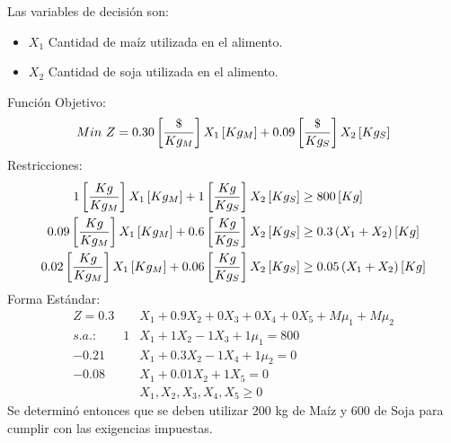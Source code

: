 \documentclass{tarea}
\begin{document}
\begin{homeworkProblem}
Las variables de decisión son:
\begin{itemize}
	\item $X_1$ Cantidad de maíz utilizada en el alimento.
	\item $X_2$ Cantidad de soja utilizada en el alimento.
\end{itemize}
Función Objetivo: 
\begin{equation}
	Min\ Z = 0.30\left[ \frac{\$}{Kg_M} \right]X_1\left[ Kg_M \right] + 0.09\left[ \frac{\$}{Kg_S} \right]X_2\left[ Kg_S \right]
\end{equation}
Restricciones:
\begin{align*}
	1\left[ \frac{Kg}{Kg_M} \right]X_1\left[ Kg_M \right] + 1\left[ \frac{Kg}{Kg_S} \right]X_2\left[ Kg_S \right] &\ge 800\left[ Kg \right] \\
	0.09\left[ \frac{Kg}{Kg_M} \right]X_1\left[ Kg_M \right] + 0.6\left[ \frac{Kg}{Kg_S} \right]X_2\left[ Kg_S \right] &\ge 0.3\left( X_1 + X_2 \right)\left[ Kg \right] \\
	0.02\left[ \frac{Kg}{Kg_M} \right]X_1\left[ Kg_M \right] + 0.06\left[ \frac{Kg}{Kg_S} \right]X_2\left[ Kg_S \right] &\ge 0.05\left( X_1 + X_2 \right)\left[ Kg \right] \\
\end{align*}
Forma Estándar:
\begin{align*}
	Z=0.3&X_1 + 0.9X_2 + 0X_3 + 0X_4 + 0X_5 + M\mu_1 + M\mu_2 \\
	s.a.:\quad \quad  1&X_1 + 1X_2 - 1X_3 + 1\mu_1 = 800 \\
	-0.21&X_1 + 0.3X_2 - 1X_4 + 1\mu_2 = 0 \\
	-0.08&X_1 + 0.01X_2 + 1X_5 = 0 \\
	&X_1,X_2,X_3,X_4,X_5  \ge 0
\end{align*}
Se determinó entonces que se deben utilizar 200 kg de Maíz y 600 de Soja para cumplir con las exigencias impuestas.
\end{homeworkProblem}
\end{document}

